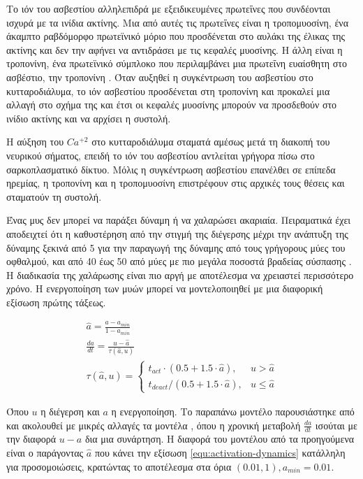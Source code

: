 Το ιόν του ασβεστίου αλληλεπιδρά με εξειδικευμένες πρωτεΐνες που συνδέονται ισχυρά με τα ινίδια ακτίνης. Μια από αυτές τις πρωτεΐνες είναι η τροπομυοσίνη, ένα άκαμπτο ραβδόμορφο πρωτεϊνικό μόριο που προσδένεται στο αυλάκι της έλικας της ακτίνης και δεν την αφήνει να αντιδράσει με τις κεφαλές μυοσίνης. Η άλλη είναι η τροπονίνη, ένα πρωτεϊνικό σύμπλοκο που περιλαμβάνει μια πρωτεΐνη ευαίσθητη στο ασβέστιο, την τροπονίνη . Όταν αυξηθεί η συγκέντρωση του ασβεστίου στο κυτταροδιάλυμα, το ιόν ασβεστίου προσδένεται στη τροπονίνη και προκαλεί μια αλλαγή στο σχήμα της και έτσι οι κεφαλές μυοσίνης μπορούν να προσδεθούν στο ινίδιο ακτίνης και να αρχίσει η συστολή.

Η αύξηση του $Ca^{+2}$ στο κυτταροδιάλυμα σταματά αμέσως μετά τη διακοπή του νευρικού σήματος, επειδή το ιόν του ασβεστίου αντλείται γρήγορα πίσω στο σαρκοπλασματικό δίκτυο. Μόλις η συγκέντρωση ασβεστίου επανέλθει σε επίπεδα ηρεμίας, η τροπονίνη και η τροπομυοσίνη επιστρέφουν στις αρχικές τους θέσεις και σταματούν τη συστολή.

Ένας μυς δεν μπορεί να παράξει δύναμη ή να χαλαρώσει ακαριαία. Πειραματικά έχει αποδειχτεί ότι η καθυστέρηση από την στιγμή της διέγερσης μέχρι την ανάπτυξη της δύναμης ξεκινά από 5 για την παραγωγή της δύναμης από τους γρήγορους μύες του οφθαλμού, και από 40 έως 50 από μύες με πιο μεγάλα ποσοστά βραδείας σύσπασης \cite{zajac89}. Η διαδικασία της χαλάρωσης είναι πιο αργή με αποτέλεσμα να χρειαστεί περισσότερο χρόνο. Η ενεργοποίηση των μυών μπορεί να μοντελοποιηθεί με μια διαφορική εξίσωση πρώτης τάξεως.

\begin{equation}
    \begin{gathered}
        \hat{a} = \frac{a - a_{min}}{1 - a_{min}}\\[10pt]
        \frac{da}{dt} = \frac{u - \hat{a}}{\tau (\hat{a}, u)}\\[10pt]
        \tau (\hat{a}, u) =
        \begin{cases}
            t_{act} \cdot (0.5 +1.5 \cdot \hat{a}), & u > \hat{a} \\
            t_{deact}/(0.5 +1.5 \cdot \hat{a}), & u \leq \hat{a}
        \end{cases}
    \end{gathered}
    \label{equ:activation-dynamics}
\end{equation}

Όπου $u$ η διέγερση και $a$ η ενεργοποίηση. Το παραπάνω μοντέλο παρουσιάστηκε από \cite{millard13} και ακολουθεί με μικρές αλλαγές τα μοντέλα \cite{thelen03, winters95}, όπου η χρονική μεταβολή $\frac{da}{dt}$ ισούται με την διαφορά $u - a$ δια μια συνάρτηση. Η διαφορά του μοντέλου από τα προηγούμενα είναι ο παράγοντας $\hat{a}$ που κάνει την εξίσωση \ref{equ:activation-dynamics} κατάλληλη για προσομοιώσεις, κρατώντας το αποτέλεσμα στα όρια $(0.01, 1), a_{min} = 0.01$.

